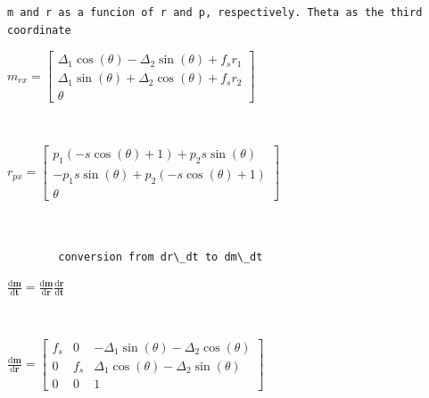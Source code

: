 \documentclass[11pt]{article}
\begin{document}
            \begin{Verbatim}[commandchars=\\\{\}]
        m and r as a funcion of r and p, respectively. Theta as the third coordinate
            \end{Verbatim}

            $\displaystyle m_{rx} = \left[\begin{matrix}\Delta_{1} \cos{\left(\theta \right)} - \Delta_{2} \sin{\left(\theta \right)} + f_{s} r_{1}\\\Delta_{1} \sin{\left(\theta \right)} + \Delta_{2} \cos{\left(\theta \right)} + f_{s} r_{2}\\\theta\end{matrix}\right]$

            
            \begin{Verbatim}[commandchars=\\\{\}]


            \end{Verbatim}

            $\displaystyle r_{px} = \left[\begin{matrix}p_{1} \left(- s \cos{\left(\theta \right)} + 1\right) + p_{2} s \sin{\left(\theta \right)}\\- p_{1} s \sin{\left(\theta \right)} + p_{2} \left(- s \cos{\left(\theta \right)} + 1\right)\\\theta\end{matrix}\right]$

            
            \begin{Verbatim}[commandchars=\\\{\}]


        conversion from dr\_dt to dm\_dt
            \end{Verbatim}

            $\displaystyle \frac{\mathrm{d}\mathbf{m}}{\mathrm{d}\mathbf{t}} = \frac{\mathrm{d}\mathbf{m}}{\mathrm{d}\mathbf{r}}\frac{\mathrm{d}\mathbf{r}}{\mathrm{d}\mathbf{t}}$

            
            \begin{Verbatim}[commandchars=\\\{\}]


            \end{Verbatim}

            $\displaystyle \frac{\mathrm{d}\mathbf{m}}{\mathrm{d}\mathbf{r}} = \left[\begin{matrix}f_{s} & 0 & - \Delta_{1} \sin{\left(\theta \right)} - \Delta_{2} \cos{\left(\theta \right)}\\0 & f_{s} & \Delta_{1} \cos{\left(\theta \right)} - \Delta_{2} \sin{\left(\theta \right)}\\0 & 0 & 1\end{matrix}\right]$
\end{document}
